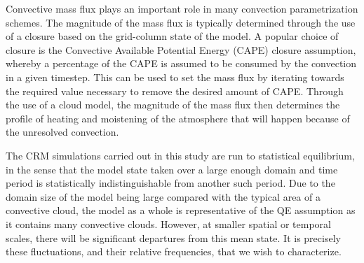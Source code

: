 \documentclass[11pt,a4paper]{article}
\newcommand\todo[1]{\textbf{TODO: #1}}
\begin{document}

Convective mass flux plays an important role in many convection parametrization schemes. The magnitude of the mass flux is typically determined through the use of a closure based on the grid-column state of the model. A popular choice of closure is the Convective Available Potential Energy (CAPE) closure assumption, whereby a percentage of the CAPE is assumed to be consumed by the convection in a given timestep. This can be used to set the mass flux by iterating towards the required value necessary to remove the desired amount of CAPE. Through the use of a cloud model, the magnitude of the mass flux then determines the profile of heating and moistening of the atmosphere that will happen because of the unresolved convection.

The CRM simulations carried out in this study are run to statistical equilibrium, in the sense that the model state taken over a large enough domain and time period is statistically indistinguishable from another such period. Due to the domain size of the model being large compared with the typical area of a convective cloud, the model as a whole is representative of the QE assumption as it contains many convective clouds. However, at smaller spatial or temporal scales, there will be significant departures from this mean state. It is precisely these fluctuations, and their relative frequencies, that we wish to characterize.
\end{document}
